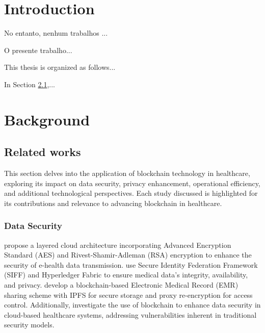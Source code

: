 \documentclass[cic,tc,english]{iiufrgs}
\begin{document}
\tableofcontents

\chapter{Introduction}





No entanto, nenhum trabalhos ...


O presente trabalho...


This thesis is organized as follows...

In Section \ref{related_works},...



\chapter{Background}

\section{Related works}
\label{related_works}
    This section delves into the application of blockchain technology in healthcare, exploring its impact on data security, privacy enhancement, operational efficiency, and additional technological perspectives. Each study discussed is highlighted for its contributions and relevance to advancing blockchain in healthcare.



    
    \subsection{Data Security} \citet{Memos2021} propose a layered cloud architecture incorporating Advanced Encryption Standard (AES) and Rivest-Shamir-Adleman (RSA) encryption to enhance the security of e-health data transmission. \citet{Tian2019} use Secure Identity Federation Framework (SIFF) and Hyperledger Fabric to ensure medical data's integrity, availability, and privacy. \citet{Liu2024} develop a blockchain-based Electronic Medical Record (EMR) sharing scheme with IPFS for secure storage and proxy re-encryption for access control. Additionally, \citet{Esposito2018} investigate the use of blockchain to enhance data security in cloud-based healthcare systems, addressing vulnerabilities inherent in traditional security models.
    
\end{document}
